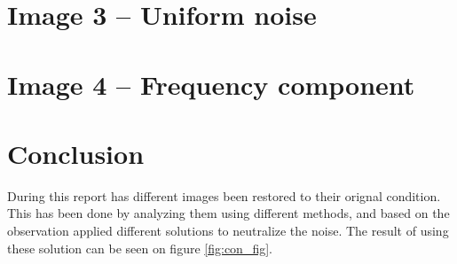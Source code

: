 \documentclass[11pt]{article}
\begin{document}
\newpage
\section{Image 3 -- Uniform noise}


\newpage
\section{Image 4 -- Frequency component}


\section{Conclusion}
During this report has different images been restored to their orignal condition. This has been done by analyzing them using different methods, and based on the observation applied different solutions to neutralize the noise. The result of using these solution can be seen on figure \ref{fig:con_fig}.
\end{document}
